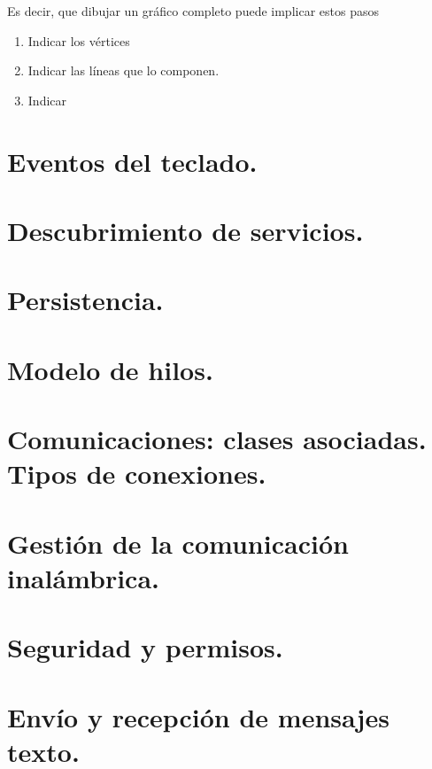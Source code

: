\documentclass[a4paper,12pt,spanish]{sphinxmanual}
\begin{document}
Es decir, que dibujar un gráfico completo puede implicar estos pasos
\begin{enumerate}
\item {} 
Indicar los vértices

\item {} 
Indicar las líneas que lo componen.

\item {} 
Indicar

\end{enumerate}


\section{Eventos del teclado.}
\label{tema2:eventos-del-teclado}

\section{Descubrimiento de servicios.}
\label{tema2:descubrimiento-de-servicios}

\section{Persistencia.}
\label{tema2:persistencia}

\section{Modelo de hilos.}
\label{tema2:modelo-de-hilos}

\section{Comunicaciones: clases asociadas. Tipos de conexiones.}
\label{tema2:comunicaciones-clases-asociadas-tipos-de-conexiones}

\section{Gestión de la comunicación inalámbrica.}
\label{tema2:gestion-de-la-comunicacion-inalambrica}

\section{Seguridad y permisos.}
\label{tema2:seguridad-y-permisos}

\section{Envío y recepción de mensajes texto.}
\label{tema2:envio-y-recepcion-de-mensajes-texto}
\end{document}
